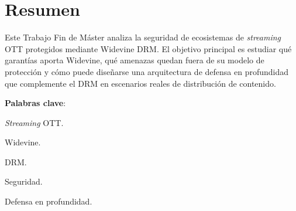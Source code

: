
\pagestyle{fancy}
\renewcommand{\headrulewidth}{0pt}
\chapter*{Resumen}

Este Trabajo Fin de Máster analiza la seguridad de ecosistemas de \textit{streaming} OTT protegidos mediante Widevine DRM. El objetivo principal es estudiar qué garantías aporta Widevine, qué amenazas quedan fuera de su modelo de protección y cómo puede diseñarse una arquitectura de defensa en profundidad que complemente el DRM en escenarios reales de distribución de contenido.

\mbox{} \bigskip

\noindent \textbf{Palabras clave}:
\begin{compactitem}
    \item \textit{Streaming} OTT.
    \item Widevine.
    \item DRM.
    \item Seguridad.
    \item Defensa en profundidad.
\end{compactitem}

\blankpage

